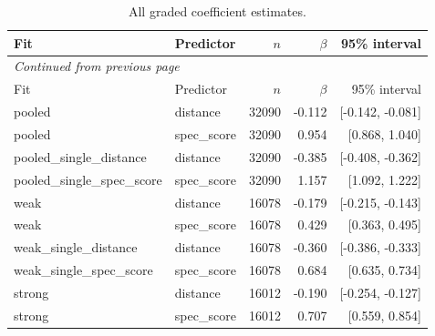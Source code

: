 \begin{longtable}{p{3.7cm}p{2.1cm}rrr}

\caption{All graded coefficient estimates.}\label{tab:graded-all-coefficients}\\

\toprule

Fit & Predictor & $n$ & $\beta$ & 95\% interval\\\midrule

\endfirsthead

\multicolumn{5}{l}{\textit{Continued from previous page}}\\

\toprule

Fit & Predictor & $n$ & $\beta$ & 95\% interval\\\midrule

\endhead

\bottomrule\endfoot

pooled & distance & 32090 & -0.112 & [-0.142, -0.081]\\

pooled & spec\_\allowbreak{}score & 32090 & 0.954 & [0.868, 1.040]\\

pooled\_\allowbreak{}single\_\allowbreak{}distance & distance & 32090 & -0.385 & [-0.408, -0.362]\\

pooled\_\allowbreak{}single\_\allowbreak{}spec\_\allowbreak{}score & spec\_\allowbreak{}score & 32090 & 1.157 & [1.092, 1.222]\\

weak & distance & 16078 & -0.179 & [-0.215, -0.143]\\

weak & spec\_\allowbreak{}score & 16078 & 0.429 & [0.363, 0.495]\\

weak\_\allowbreak{}single\_\allowbreak{}distance & distance & 16078 & -0.360 & [-0.386, -0.333]\\

weak\_\allowbreak{}single\_\allowbreak{}spec\_\allowbreak{}score & spec\_\allowbreak{}score & 16078 & 0.684 & [0.635, 0.734]\\

strong & distance & 16012 & -0.190 & [-0.254, -0.127]\\

strong & spec\_\allowbreak{}score & 16012 & 0.707 & [0.559, 0.854]\\


\end{longtable}
